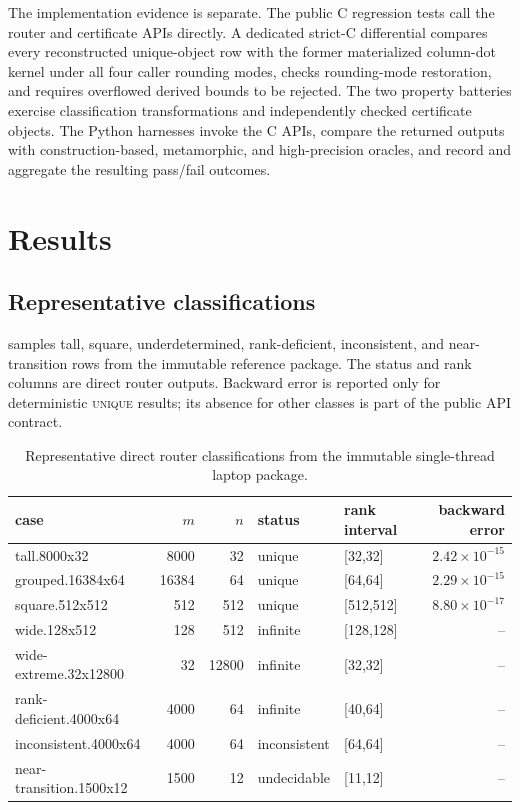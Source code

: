 \documentclass[11pt]{article}
\theoremstyle{definition}
\begin{document}
The implementation evidence is separate. The public C regression tests call
the router and certificate APIs directly. A dedicated strict-C differential
compares every reconstructed unique-object row with the former materialized
column-dot kernel under all four caller rounding modes, checks rounding-mode
restoration, and requires overflowed derived bounds to be rejected. The two
property batteries exercise classification transformations and independently
checked certificate objects.
The Python harnesses invoke the C APIs, compare the returned outputs with
construction-based, metamorphic, and high-precision oracles, and record and
aggregate the resulting pass/fail outcomes.

\section{Results}\label{sec:results}
\subsection{Representative classifications}
 samples tall, square, underdetermined,
rank-deficient, inconsistent, and near-transition rows from the immutable
reference package. The status and rank columns are direct router outputs.
Backward error is reported only for deterministic \textsc{unique} results;
its absence for other classes is part of the public API contract.

\begin{table}[ht]
\centering
\caption{Representative direct router classifications from the immutable
single-thread laptop package.}
\label{tab:representative-status}
\small
\begin{tabular}{lrrllr}
\toprule
case & $m$ & $n$ & status & rank interval & backward error\\
\midrule
tall.8000x32 & 8000 & 32 & unique & [32,32] & $2.42\times10^{-15}$\\
grouped.16384x64 & 16384 & 64 & unique & [64,64] & $2.29\times10^{-15}$\\
square.512x512 & 512 & 512 & unique & [512,512] & $8.80\times10^{-17}$\\
wide.128x512 & 128 & 512 & infinite & [128,128] & --\\
wide-extreme.32x12800 & 32 & 12800 & infinite & [32,32] & --\\
rank-deficient.4000x64 & 4000 & 64 & infinite & [40,64] & --\\
inconsistent.4000x64 & 4000 & 64 & inconsistent & [64,64] & --\\
near-transition.1500x12 & 1500 & 12 & undecidable & [11,12] & --\\
\bottomrule
\end{tabular}
\end{table}
\end{document}
